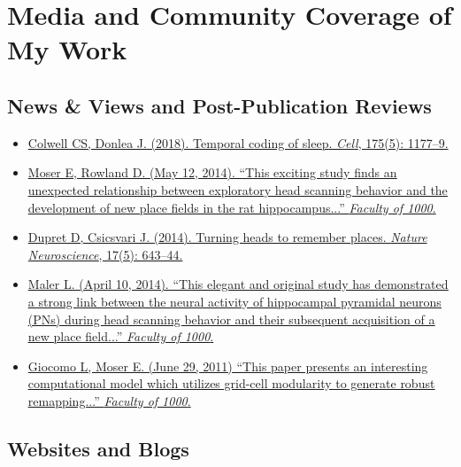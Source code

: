 \documentclass[10pt]{article}
\newcommand{\itemtitle}[1]{{\color{hopkinsblue}\ul{#1}}}
\begin{document}
\section*{Media and Community Coverage of My Work}

\subsection*{News \& Views and Post-Publication Reviews}

\begin{itemize}
  \item \href{https://doi.org/10.1016/j.cell.2018.10.047}
    {Colwell CS, Donlea J. (2018). \itemtitle{Temporal coding of sleep}. \emph{Cell}, 175(5): 1177--9.}
  \item \href{http://f1000prime.com/718333676#eval793494783}
    {Moser E, Rowland D. (May 12, 2014). ``\itemtitle{This exciting study finds
        an unexpected relationship between exploratory head scanning behavior and the
        development of new place fields in the rat hippocampus...}” \emph{Faculty of
    1000}.}
  \item \href{https://doi.org/10.1038/nn.3700}
    {Dupret D, Csicsvari J. (2014). \itemtitle{Turning heads to remember
    places}. \emph{Nature Neuroscience}, 17(5): 643--44.}
  \item \href{http://f1000prime.com/718333676#eval793493493}
    {Maler L. (April 10, 2014). ``\itemtitle{This elegant and original study has
        demonstrated a strong link between the neural activity of hippocampal pyramidal
        neurons (PNs) during head scanning behavior and their subsequent acquisition of
    a new place field...}'' \emph{Faculty of 1000}.}
  \item \href{http://f1000.com/11553956}
    {Giocomo L, Moser E. (June 29, 2011) ``\itemtitle{This paper presents an
        interesting computational model which utilizes grid-cell modularity to generate
    robust remapping...}'' \emph{Faculty of 1000}.}
\end{itemize}

\subsection*{Websites and Blogs}
\end{document}
